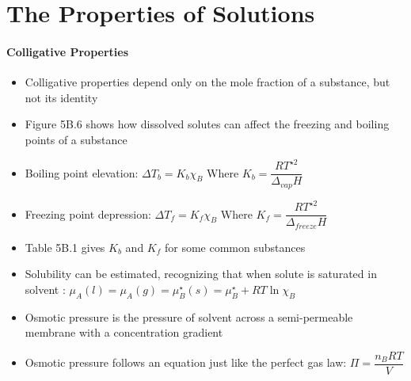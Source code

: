 \documentclass[12pt, openany, letterpaper]{memoir}
\begin{document}
\section{The Properties of Solutions}
\paragraph{Colligative Properties}
\begin{itemize}
	\item Colligative properties depend only on the mole fraction of a substance, but not its identity
	\item Figure 5B.6 shows how dissolved solutes can affect the freezing and boiling points of a substance
	\item Boiling point elevation: $\Delta T_b = K_b\chi_B$ Where $K_b=\dfrac{RT^{\star2}}{\Delta_{vap}H}$
	\item Freezing point depression: $\Delta T_f = K_f\chi_B$ Where $K_f=\dfrac{RT^{\star2}}{\Delta_{freeze}H}$
	\item Table 5B.1 gives $K_b$ and $K_f$ for some common substances
	\item Solubility can be estimated, recognizing that when solute  is saturated in solvent : $\mu_{A}(l) = \mu_{{A}}(g)=\mu^\star_B(s)=\mu^\star_B+RT\ln\chi_B$
	\item Osmotic pressure is the pressure of solvent across a semi-permeable membrane with a concentration gradient
	\item Osmotic pressure follows an equation just like the perfect gas law: $\Pi = \dfrac{n_BRT}{V}$
\end{itemize}
\end{document}
